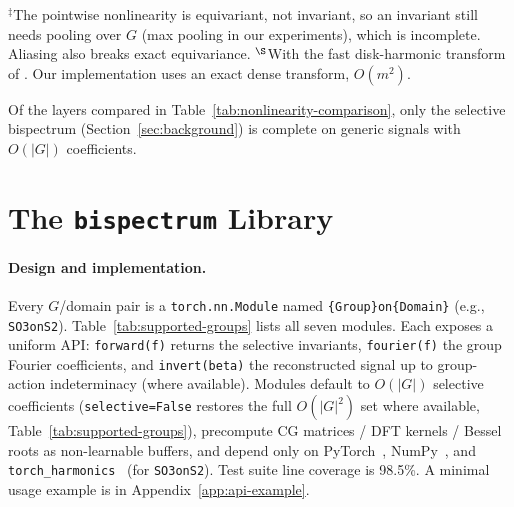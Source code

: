\documentclass{article}
\theoremstyle{definition}
\theoremstyle{remark}
\theoremstyle{definition}
\begin{document}
\begin{table}[t]
  \vspace{0.3em}
  {\small $^\ddagger$The pointwise nonlinearity is equivariant, not invariant, so an invariant still needs pooling over $G$ (max pooling in our experiments), which is incomplete. Aliasing also breaks exact equivariance. $^\S$With the fast disk-harmonic transform of \citet{marshall2023fast}. Our implementation uses an exact dense transform, $O(m^2)$.}
\end{table}

Of the layers compared in Table~\ref{tab:nonlinearity-comparison}, only the selective
bispectrum (Section~\ref{sec:background}) is complete on generic signals with
$O(|G|)$ coefficients.


\section{The \texttt{bispectrum} Library}
\label{sec:library}

\paragraph{Design and implementation.} \label{sec:design} Every $G$/domain pair is a \texttt{torch.nn.Module} named
\texttt{\{Group\}on\{Domain\}} (e.g., \texttt{SO3onS2}).
Table~\ref{tab:supported-groups} lists all seven modules. Each exposes a
uniform API: \texttt{forward(f)} returns the selective invariants,
\texttt{fourier(f)} the group Fourier coefficients, and
\texttt{invert(beta)} the reconstructed signal up to group-action
indeterminacy (where available). Modules default to $O(|G|)$
selective coefficients (\texttt{selective=False} restores the full
$O(|G|^2)$ set where available, Table~\ref{tab:supported-groups}), precompute CG matrices / DFT kernels / Bessel
roots as non-learnable buffers, and depend only on
PyTorch~\citep{paszke2019pytorch}, NumPy~\citep{harris2020numpy},
and \texttt{torch\_harmonics}~\citep{bonev2023spherical} (for
\texttt{SO3onS2}). Test suite line coverage is 98.5\%. A minimal
usage example is in Appendix~\ref{app:api-example}.
\end{document}
